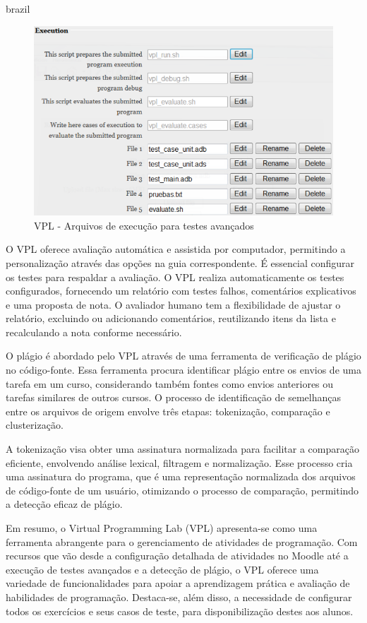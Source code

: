 \begin{otherlanguage*}{brazil}
\begin{figure}[h!]
	   \centering
            \caption{VPL - Arquivos de execução para testes avançados}
            \label{fig:ModeloConceitual}
	   	\includegraphics[scale=0.5]{pictures/VPL_testes_avancados.png}
\end{figure}

O VPL oferece avaliação automática e assistida por computador, permitindo a personalização através das opções na guia correspondente. É essencial configurar os testes para respaldar a avaliação. O VPL realiza automaticamente os testes configurados, fornecendo um relatório com testes falhos, comentários explicativos e uma proposta de nota. O avaliador humano tem a flexibilidade de ajustar o relatório, excluindo ou adicionando comentários, reutilizando itens da lista e recalculando a nota conforme necessário.

O plágio é abordado pelo VPL através de uma ferramenta de verificação de plágio no código-fonte. Essa ferramenta procura identificar plágio entre os envios de uma tarefa em um curso, considerando também fontes como envios anteriores ou tarefas similares de outros cursos. O processo de identificação de semelhanças entre os arquivos de origem envolve três etapas: tokenização, comparação e clusterização. 

A tokenização visa obter uma assinatura normalizada para facilitar a comparação eficiente, envolvendo análise lexical, filtragem e normalização. Esse processo cria uma assinatura do programa, que é uma representação normalizada dos arquivos de código-fonte de um usuário, otimizando o processo de comparação, permitindo a detecção eficaz de plágio.

Em resumo, o Virtual Programming Lab (VPL) apresenta-se como uma ferramenta abrangente para o gerenciamento de atividades de programação. Com recursos que vão desde a configuração detalhada de atividades no Moodle até a execução de testes avançados e a detecção de plágio, o VPL oferece uma variedade de funcionalidades para apoiar a aprendizagem prática e avaliação de habilidades de programação. Destaca-se, além disso, a necessidade de configurar todos os exercícios e seus casos de teste, para disponibilização destes aos alunos.



\end{otherlanguage*}
